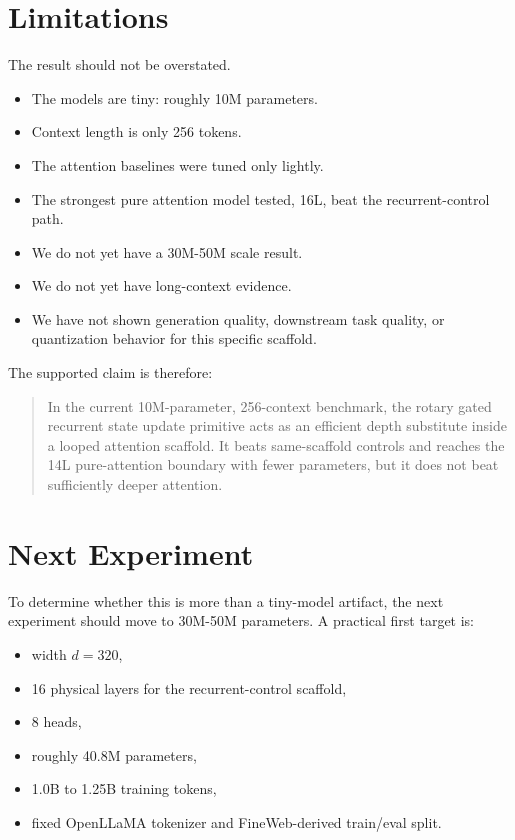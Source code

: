 \documentclass[11pt]{article}
\newcommand{\primitive}{rotary gated recurrent state update primitive}
\begin{document}
\section{Limitations}

The result should not be overstated.

\begin{itemize}
  \item The models are tiny: roughly 10M parameters.
  \item Context length is only 256 tokens.
  \item The attention baselines were tuned only lightly.
  \item The strongest pure attention model tested, 16L, beat the recurrent-control path.
  \item We do not yet have a 30M-50M scale result.
  \item We do not yet have long-context evidence.
  \item We have not shown generation quality, downstream task quality, or
    quantization behavior for this specific scaffold.
\end{itemize}

The supported claim is therefore:

\begin{quote}
In the current 10M-parameter, 256-context benchmark, the \primitive{} acts as
an efficient depth substitute inside a looped attention scaffold. It beats
same-scaffold controls and reaches the 14L pure-attention boundary with fewer
parameters, but it does not beat sufficiently deeper attention.
\end{quote}

\section{Next Experiment}

To determine whether this is more than a tiny-model artifact, the next
experiment should move to 30M-50M parameters. A practical first target is:

\begin{itemize}
  \item width $d=320$,
  \item 16 physical layers for the recurrent-control scaffold,
  \item 8 heads,
  \item roughly 40.8M parameters,
  \item 1.0B to 1.25B training tokens,
  \item fixed OpenLLaMA tokenizer and FineWeb-derived train/eval split.
\end{itemize}
\end{document}
